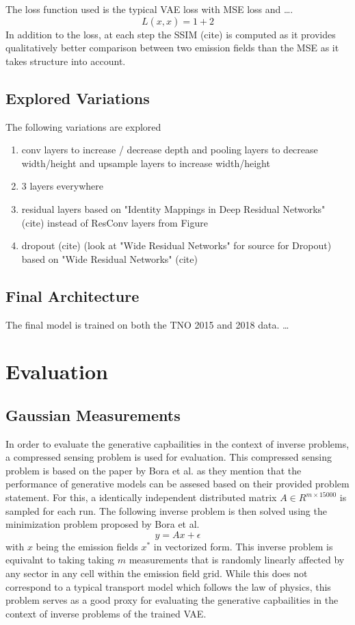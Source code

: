 The loss function used is the typical VAE loss with MSE loss and \dots .
\begin{equation}
    L(x, \hat{x}) = 1 + 2
\end{equation}
In addition to the loss, at each step the SSIM (cite) is computed as it provides qualitatively better comparison between two emission fields than the MSE as it takes structure into account.

\subsection{Explored Variations}
The following variations are explored
\begin{enumerate}
    \item conv layers to increase / decrease depth and pooling layers to decrease width/height and upsample layers to increase width/height
    \item 3 layers everywhere
    \item residual layers based on "Identity Mappings in Deep Residual Networks" (cite) instead of ResConv layers from Figure
    \item dropout (cite) (look at "Wide Residual Networks" for source for Dropout) based on "Wide Residual Networks" (cite)
\end{enumerate}

\subsection{Final Architecture}
The final model is trained on both the TNO 2015 and 2018 data.
\dots

\section{Evaluation}

\subsection{Gaussian Measurements}
In order to evaluate the generative capbailities in the context of inverse problems, a compressed sensing problem is used for evaluation.
This compressed sensing problem is based on the paper by Bora et al. as they mention that the performance of generative models can be assesed based on their provided problem statement.
For this, a identically independent distributed matrix $A \in R^{m \times 15000}$ is sampled for each run.
The following inverse problem is then solved using the minimization problem proposed by Bora et al.
\begin{equation}
    y = A x + \epsilon
\end{equation}
with $x$ being the emission fields $x^*$ in vectorized form.
This inverse problem is equivalnt to taking taking $m$ measurements that is randomly linearly affected by any sector in any cell within the emission field grid.
While this does not correspond to a typical transport model which follows the law of physics, this problem serves as a good proxy for evaluating the generative capbailities in the context of inverse problems of the trained VAE. 

